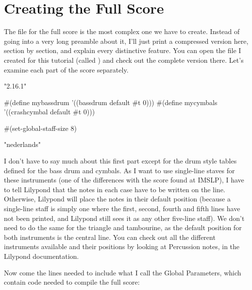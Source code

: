 \documentclass[../../LilyPond-Tutorials]{subfiles}
\begin{document}
\section{Creating the Full Score}

The file for the full score is the most complex one we have to create.
Instead of going into a very long preamble about it, I'll just print a compressed version here, section by section, and explain every distinctive feature.
You can open the file I created for this tutorial (called ) and check out the complete version there.
Let's examine each part of the score separately.

\begin{lilypondcode}
\version "2.16.1"


#(define mybassdrum '((bassdrum default #t 0))) 
#(define mycymbals '((crashcymbal default #t 0)))

#(set-global-staff-size 8)


\language "nederlands" %
\end{lilypondcode}

I don't have to say much about this first part except for the drum style tables defined for the bass drum and cymbals.
As I want to use single-line staves for these instruments (one of the differences with the score found at IMSLP), I have to tell Lilypond that the notes in each case have to be written on the line.
Otherwise, Lilypond will place the notes in their default position (because a single-line staff is simply one where the first, second, fourth and fifth lines have not been printed, and Lilypond still sees it as any other five-line staff).
We don't need to do the same for the triangle and tambourine, as the default position for both instruments is the central line.
You can check out all the different instruments available and their positions by looking at Percussion notes, in the Lilypond documentation.

Now come the lines needed to include what I call the Global Parameters, which contain code needed to compile the full score:

\begin{lilypondcode}




\end{lilypondcode}
\end{document}
